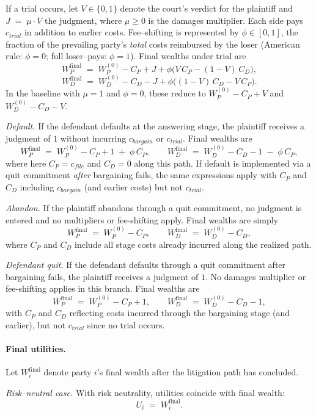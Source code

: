 \documentclass{article}
\begin{document}
If a trial occurs, let $V\in\{0,1\}$ denote the court’s verdict for the plaintiff and $J \;=\; \mu \cdot V$ the judgment, where $\mu\ge 0$ is the damages multiplier. Each side pays $c_{trial}$ in addition to earlier costs. Fee–shifting is represented by $\phi\in[0,1]$, the fraction of the prevailing party’s \emph{total} costs reimbursed by the loser (American rule: $\phi=0$; full loser–pays: $\phi=1$). Final wealths under trial are
\[
W_P^{\mathrm{final}}
\;=\;
W_P^{(0)} - C_P + J + \phi\bigl(V\,C_P - (1-V)\,C_D\bigr),
\]
\[
W_D^{\mathrm{final}}
\;=\;
W_D^{(0)} - C_D - J + \phi\bigl((1-V)\,C_D - V\,C_P\bigr).
\]
In the baseline with $\mu=1$ and $\phi=0$, these reduce to $W_P^{(0)}-C_P+V$ and $W_D^{(0)}-C_D-V$.

\emph{Default.} If the defendant defaults at the answering stage, the plaintiff receives a judgment of $1$ without incurring $c_{bargain}$ or $c_{trial}$. Final wealths are
\[
W_P^{\mathrm{final}} \;=\; W_P^{(0)} - C_P + 1 \;+\; \phi\,C_P,
\qquad
W_D^{\mathrm{final}} \;=\; W_D^{(0)} - C_D - 1 \;-\; \phi\,C_P,
\]
where here $C_P=c_{file}$ and $C_D=0$ along this path. If default is implemented via a quit commitment \emph{after} bargaining fails, the same expressions apply with $C_P$ and $C_D$ including $c_{bargain}$ (and earlier costs) but not $c_{trial}$.

\emph{Abandon.} If the plaintiff abandons through a quit commitment, no judgment is entered and no multipliers or fee-shifting apply. Final wealths are simply
\[
W_P^{\mathrm{final}} \;=\; W_P^{(0)} - C_P,
\qquad
W_D^{\mathrm{final}} \;=\; W_D^{(0)} - C_D,
\]
where $C_P$ and $C_D$ include all stage costs already incurred along the realized path.

\emph{Defendant quit.} If the defendant defaults through a quit commitment after bargaining fails, the plaintiff receives a judgment of $1$. No damages multiplier or fee-shifting applies in this branch. Final wealths are
\[
W_P^{\mathrm{final}} \;=\; W_P^{(0)} - C_P + 1,
\qquad
W_D^{\mathrm{final}} \;=\; W_D^{(0)} - C_D - 1,
\]
with $C_P$ and $C_D$ reflecting costs incurred through the bargaining stage (and earlier), but not $c_{trial}$ since no trial occurs.

\paragraph{Final utilities.}
Let $W_i^{\mathrm{final}}$ denote party $i$'s final wealth after the litigation path has concluded.

\emph{Risk–neutral case.} With risk neutrality, utilities coincide with final wealth:
\[
U_i \;=\; W_i^{\mathrm{final}}.
\]
\end{document}
